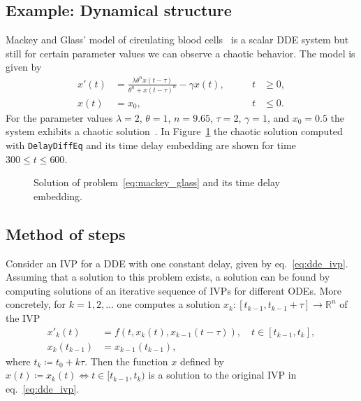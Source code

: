 \documentclass{juliacon}
\def\pkg#1{\texttt{#1}}
\begin{document}
\subsection{Example: Dynamical structure}

Mackey and Glass' model of circulating blood cells~\cite{glass79} is a scalar DDE system but
still for certain parameter values we can observe a chaotic behavior.
The model is given by
\begin{equation}\label{eq:mackey_glass}
    \begin{aligned}
        x'(t) &= \frac{\lambda \theta^{n} x(t - \tau)}{\theta^{n} + x{(t - \tau)}^n} - \gamma x(t), \qquad & t &\geq 0, \\
        x(t) &= x_{0}, \qquad & t &\leq 0.
    \end{aligned}
\end{equation}
For the parameter values $\lambda = 2$, $\theta = 1$, $n = 9.65$, $\tau = 2$, $\gamma = 1$, and $x_{0} = 0.5$ the system exhibits a chaotic solution~\cite[Figure~6(e)]{glass79}.
In Figure~\ref{fig:mackey_glass} the chaotic solution computed with \pkg{DelayDiffEq} and its time delay embedding are shown for time $300 \leq t \leq 600$.

\begin{figure}
    \centering
    
    \caption{Solution of problem~\eqref{eq:mackey_glass} and its time delay embedding.}
    \label{fig:mackey_glass}
\end{figure}

\subsection{Method of steps}

Consider an IVP for a DDE with one constant delay, given by eq.~\eqref{eq:dde_ivp}.
Assuming that a solution to this problem exists, a solution can be found by
computing solutions of an iterative sequence of IVPs for different ODEs. More
concretely, for $k = 1,2,\ldots$ one computes a solution
$x_k \colon [t_{k-1}, t_{k-1} + \tau] \to \mathbb{R}^n$ of the IVP
\begin{equation}\label{eq:ode_method_of_steps}
    \begin{aligned}
        x'_k(t) &= f(t, x_k(t), x_{k-1}(t - \tau)), \quad t \in [t_{k-1}, t_k], \\
        x_k(t_{k-1}) &= x_{k-1}(t_{k-1}),
    \end{aligned}
\end{equation}
where $t_k \coloneqq t_0 + k\tau$. Then the function $x$ defined by
$x(t) \coloneqq x_k(t) \Longleftrightarrow t \in [t_{k-1}, t_k)$ is a solution
to the original IVP in eq.~\eqref{eq:dde_ivp}.
\end{document}
